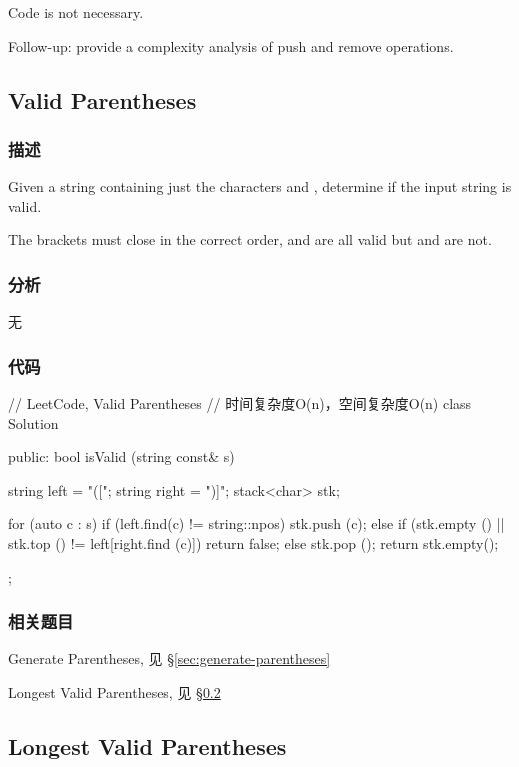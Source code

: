 Code is not necessary. 

Follow-up: provide a complexity analysis of push and remove operations.


\subsection{Valid Parentheses} %
\label{sec:valid-parentheses}


\subsubsection{描述}
Given a string containing just the characters \code{'(', ')', '\{', '\}', '['} and \code{']'}, determine if the input string is valid.

The brackets must close in the correct order,  and  are all valid but \code{"(]"} and  are not.


\subsubsection{分析}
无


\subsubsection{代码}
\begin{Code}
	// LeetCode, Valid Parentheses
	// 时间复杂度O(n)，空间复杂度O(n)
	class Solution {
		public:
		bool isValid (string const& s) {
			string left = "([{";
				string right = ")]}";
			stack<char> stk;
			
			for (auto c : s) {
				if (left.find(c) != string::npos) {
					stk.push (c);
				} else {
				if (stk.empty () || stk.top () != left[right.find (c)])
				return false;
				else
				stk.pop ();
			}
		}
		return stk.empty();
	}
};
\end{Code}


\subsubsection{相关题目}
\begindot
\item Generate Parentheses, 见 \S \ref{sec:generate-parentheses}
\item Longest Valid Parentheses, 见 \S \ref{sec:longest-valid-parentheses}
\myenddot


\subsection{Longest Valid Parentheses} %
\label{sec:longest-valid-parentheses}


